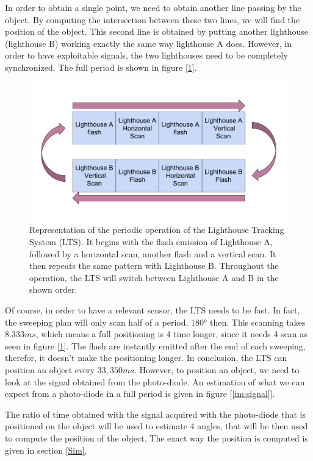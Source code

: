 \documentclass{vldb}
\begin{document}
In order to obtain a single point, we need to obtain another line passing by the object. By computing the intersection between these two lines, we will find the position of the object. This second line is obtained by putting another lighthouse (lighthouse B) working exactly the same way lighthouse A does. However, in order to have exploitable signals, the two lighthouses need to be completely synchronized. The full period is shown in figure [\ref{im:LHloop}].

\begin{figure}[h!]
  \includegraphics[scale = 0.24]{Image/LHLoop2.png}
  \caption{Representation of the periodic operation of the Lighthouse Tracking System (LTS). It begins with the flash emission of Lighthouse A, followed by a horizontal scan, another flash and a vertical scan. It then repeats the same pattern with Lighthouse B. Throughout the operation, the LTS will switch between Lighthouse A and B in the shown order.}
  \label{im:LHloop}
\end{figure}

Of course, in order to have a relevant sensor, the LTS needs to be fast. In fact, the sweeping plan will only scan half of a period, 180° then. This scanning takes $8.333 ms$, which means a full positioning is 4 time longer, since it needs 4 scan as seen in figure [\ref{im:LHloop}]. The flash are instantly emitted after the end of each sweeping, therefor, it doesn't make the positioning longer. In conclusion, the LTS can position an object every $33,350 ms$. \newline
However, to position an object, we need to look at the signal obtained from the photo-diode. An estimation of what we can expect from a photo-diode in a full period is given in figure [\ref{im:signal}].

The ratio of time obtained with the signal acquired with the photo-diode that is positioned on the object will be used to estimate 4 angles, that will be then used to compute the position of the object. The exact way the position is computed is given in section \ref{Sim}. \newline
\end{document}

